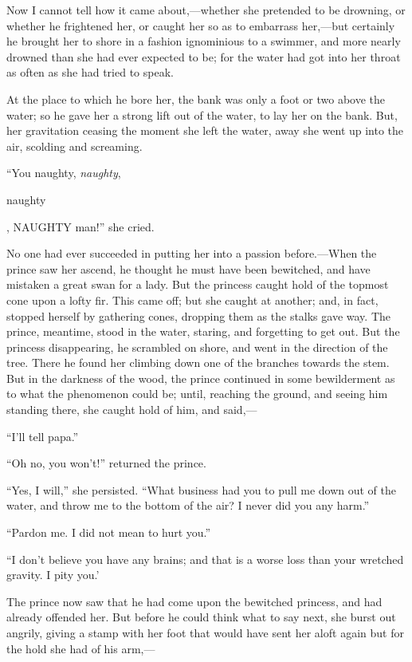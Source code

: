 \documentclass[12pt]{memoir}
\begin{document}
Now I cannot tell how it came about,---whether she pretended to be
drowning, or whether he frightened her, or caught her so as to
embarrass her,---but certainly he brought her to shore in a fashion
ignominious to a swimmer, and more nearly drowned than she had ever
expected to be; for the water had got into her throat as often as she
had tried to speak.

At the place to which he bore her, the bank was only a foot or two
above the water; so he gave her a strong lift out of the water, to
lay her on the bank.  But, her gravitation ceasing the moment she
left the water, away she went up into the air, scolding and
screaming.

``You naughty, \emph{naughty},
\begin{scshape}\MakeLowercase{NAUGHTY}\end{scshape}, NAUGHTY man!'' 
she cried.

No one had ever succeeded in putting her into a passion before.---When
the prince saw her ascend, he thought he must have been bewitched, and
have mistaken a great swan for a lady.  But the princess caught hold
of the topmost cone upon a lofty fir.  This came off; but she caught
at another; and, in fact, stopped herself by gathering cones, dropping
them as the stalks gave way.  The prince, meantime, stood in the
water, staring, and forgetting to get out.  But the princess
disappearing, he scrambled on shore, and went in the direction of the
tree.  There he found her climbing down one of the branches towards
the stem.  But in the darkness of the wood, the prince continued in
some bewilderment as to what the phenomenon could be; until, reaching
the ground, and seeing him standing there, she caught hold of him, and
said,---

``I'll tell papa.''

``Oh no, you won't!'' returned the prince.

``Yes, I will,'' she persisted.  ``What business had you to pull me
down out of the water, and throw me to the bottom of the air?  I never
did you any harm.''

``Pardon me.  I did not mean to hurt you.''

``I don't believe you have any brains; and that is a worse loss than
your wretched gravity.  I pity you.'

The prince now saw that he had come upon the bewitched princess, and
had already offended her.  But before he could think what to say next,
she burst out angrily, giving a stamp with her foot that would have
sent her aloft again but for the hold she had of his arm,---
\end{document}
